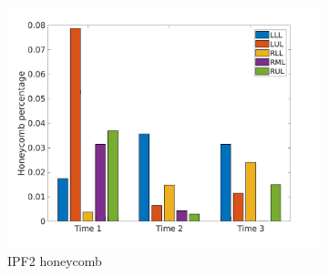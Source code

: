 \begin{figure}[H]
\begin{subfigure}{.46\linewidth}%
  \includegraphics[width=\linewidth,trim={{.0\wd0} {.0\wd0} {.0\wd0} {.0\wd0}},clip]{Appendix/Image_AppexA/LobarDistribution/IPF2HoneycombLobarRegionDiseaseDistributionOverTime.jpg} %
  \caption{IPF2 honeycomb}
  \label{fig:IPF2LobarRegionDiseaseDistributionOverTime-c} 
\end{subfigure} 
\hspace{.3in}
\begin{subfigure}{.46\linewidth}%

\end{subfigure}
\end{figure}
